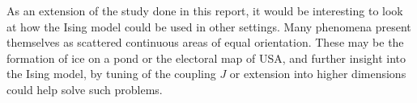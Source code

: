 \documentclass[]{article}
\begin{document}
\vspace{5mm}

As an extension of the study done in this report, it would be interesting to look at how the Ising model could be used in other settings. Many phenomena present themselves as scattered continuous areas of equal orientation. These may be the formation of ice on a pond or the electoral map of USA, and further insight into the Ising model, by tuning of the coupling $J$ or extension into higher dimensions could help solve such problems.



\end{document}
